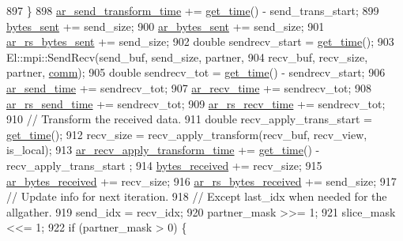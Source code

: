 \begin{DoxyCode}
897     \}
898     \hyperlink{classlbann_1_1lbann__comm_a4e3d35520a8f567579f9235e9808ba1c}{ar\_send\_transform\_time} += \hyperlink{namespacelbann_a478d36031ff0659893c4322cd856157f}{get\_time}() - send\_trans\_start;
899     \hyperlink{classlbann_1_1lbann__comm_ad1f146ae7337ece6266fd307944928e0}{bytes\_sent} += send\_size;
900     \hyperlink{classlbann_1_1lbann__comm_aa520c16eafde742b70daf60866afc6a8}{ar\_bytes\_sent} += send\_size;
901     \hyperlink{classlbann_1_1lbann__comm_ac74bcfb565c1bb6604f336c6d1b647cc}{ar\_rs\_bytes\_sent} += send\_size;
902     \textcolor{keywordtype}{double} sendrecv\_start = \hyperlink{namespacelbann_a478d36031ff0659893c4322cd856157f}{get\_time}();
903     El::mpi::SendRecv(send\_buf, send\_size, partner,
904                       recv\_buf, recv\_size, partner, \hyperlink{file__io_8cpp_ab048c6f9fcbcfaa57ce68b00263dbebe}{comm});
905     \textcolor{keywordtype}{double} sendrecv\_tot = \hyperlink{namespacelbann_a478d36031ff0659893c4322cd856157f}{get\_time}() - sendrecv\_start;
906     \hyperlink{classlbann_1_1lbann__comm_a60a664f47efb52d9936b72d34059d1ef}{ar\_send\_time} += sendrecv\_tot;
907     \hyperlink{classlbann_1_1lbann__comm_a4c9323938961c3524dc67f4b7b47e3ae}{ar\_recv\_time} += sendrecv\_tot;
908     \hyperlink{classlbann_1_1lbann__comm_aaadab22d368e8004a9877828a3bc9e93}{ar\_rs\_send\_time} += sendrecv\_tot;
909     \hyperlink{classlbann_1_1lbann__comm_adefa0ee8b0a6b74072448e20d40f502d}{ar\_rs\_recv\_time} += sendrecv\_tot;
910     \textcolor{comment}{// Transform the received data.}
911     \textcolor{keywordtype}{double} recv\_apply\_trans\_start = \hyperlink{namespacelbann_a478d36031ff0659893c4322cd856157f}{get\_time}();
912     recv\_size = recv\_apply\_transform(recv\_buf, recv\_view, is\_local);
913     \hyperlink{classlbann_1_1lbann__comm_aa642b0ae2321fa464b0092da527f6375}{ar\_recv\_apply\_transform\_time} += \hyperlink{namespacelbann_a478d36031ff0659893c4322cd856157f}{get\_time}() - recv\_apply\_trans\_start
      ;
914     \hyperlink{classlbann_1_1lbann__comm_afb99f57f7eafc0695bf28e6c26a8120f}{bytes\_received} += recv\_size;
915     \hyperlink{classlbann_1_1lbann__comm_aa5f3c53358bf9002b9fab41918b0c8c1}{ar\_bytes\_received} += recv\_size;
916     \hyperlink{classlbann_1_1lbann__comm_a2c3e1db0f6d2345748132322b0555db7}{ar\_rs\_bytes\_received} += send\_size;
917     \textcolor{comment}{// Update info for next iteration.}
918     \textcolor{comment}{// Except last\_idx when needed for the allgather.}
919     send\_idx = recv\_idx;
920     partner\_mask >>= 1;
921     slice\_mask <<= 1;
922     \textcolor{keywordflow}{if} (partner\_mask > 0) \{

\end{DoxyCode}
